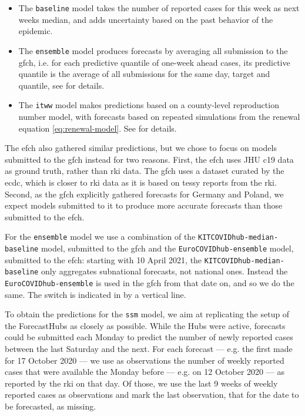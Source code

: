 \begin{itemize}
    \item The \texttt{baseline} model takes the number of reported cases for this week as next weeks median, and adds uncertainty based on the past behavior of the epidemic.
    \item The \texttt{ensemble} model produces forecasts by averaging all submission to the \acrlong{gfch}, i.e. for each predictive quantile of one-week ahead cases, its predictive quantile is the average of all submissions for the same day, target and quantile, see \citep{Sherratt2023Predictive} for details.
    \item The \texttt{itww} model makes predictions based on a county-level reproduction number model, with forecasts based on repeated simulations from the renewal equation \eqref{eq:renewal-model}. See \citep{Heyder2022Regional} for details.
\end{itemize}

The \gls{efch} \citep{Sherratt2023Predictive} also gathered similar predictions, but we chose to focus on models submitted to the \gls{gfch} instead for two reasons. 
First, the \gls{efch} uses JHU \gls{c19} data \citep{Dong2020} as ground truth, rather than \gls{rki} data. The \gls{gfch} uses a dataset curated by the \gls{ecdc}, which is closer to \gls{rki} data as it is based on \gls{tessy} reports from the \gls{rki}. Second, as the \gls{gfch} explicitly gathered forecasts for Germany and Poland, we expect models submitted to it to produce more accurate forecasts than those submitted to the \gls{efch}. 

For the \texttt{ensemble} model we use a combination of the \texttt{KITCOVIDhub-median-baseline} model, submitted to the \gls{gfch} and the \texttt{EuroCOVIDhub-ensemble} model, submitted to the \gls{efch}: starting with 10 April 2021, the \texttt{KITCOVIDhub-median-baseline} only aggregates subnational forecasts, not national ones. Instead the \texttt{EuroCOVIDhub-ensemble} is used in the \gls{gfch} from that date on, and so we do the same. The switch is indicated in  by a vertical line. 

To obtain the predictions for the \texttt{ssm} model, we aim at replicating the setup of the ForecastHubs as closely as possible. While the Hubs were active, forecasts could be submitted each Monday to predict the number of newly reported cases between the last Saturday and the next. For each forecast --- e.g. the first made for 17 October 2020 --- we use as observations the number of weekly reported cases that were available the Monday before --- e.g. on 12 October 2020 --- as reported by the \gls{rki} on that day. Of those, we use the last 9 weeks of weekly reported cases as observations and mark the last observation, that for the date to be forecasted, as missing. 

